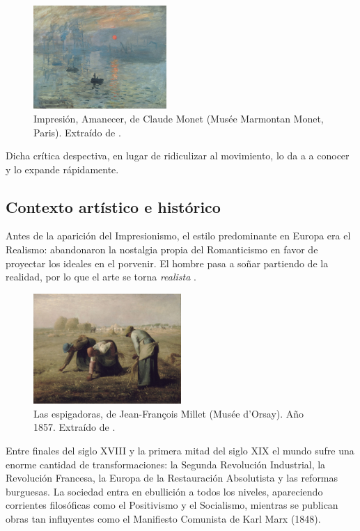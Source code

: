 \documentclass[../main.tex]{subfiles}
\begin{document}
\begin{figure}[h]
    \centering
    \includegraphics[width=0.45\textwidth]{imagenes/Monet_Amanecer.jpg}
    \caption[Impresión, Amanecer, de Claude Monet]{Impresión, Amanecer, de Claude Monet (Musée Marmontan Monet, Paris). Extraído de \cite{Monet1873}.}
    \label{fig:monet_amanecer}
\end{figure}

Dicha crítica despectiva, en lugar de ridiculizar al movimiento, lo da a a conocer y lo expande rápidamente.

\subsection{Contexto artístico e histórico}

Antes de la aparición del Impresionismo, el estilo predominante en Europa era el Realismo: abandonaron la nostalgia propia del Romanticismo en favor de proyectar los ideales en el porvenir. El hombre pasa a soñar partiendo de la realidad, por lo que el arte se torna \textit{realista} \cite{EditorialSalvat2006}.

\begin{figure}[h!]
    \centering
    \includegraphics[width=0.5\textwidth]{imagenes/Las espigadoras.jpg}
    \caption[Las espigadoras, de Jean-François Millet]{Las espigadoras, de Jean-François Millet (Musée d'Orsay). Año 1857. Extraído de \cite{Millet1857}.}
    \label{fig:millet_espigadoras}
\end{figure}

Entre finales del siglo XVIII y la primera mitad del siglo XIX el mundo sufre una enorme cantidad de transformaciones: la Segunda Revolución Industrial, la Revolución Francesa, la Europa de la Restauración Absolutista y las reformas burguesas. La sociedad entra en ebullición a todos los niveles, apareciendo corrientes filosóficas como el Positivismo y el Socialismo, mientras se publican obras tan influyentes como el Manifiesto Comunista de Karl Marx (1848).
\newline
\end{document}

